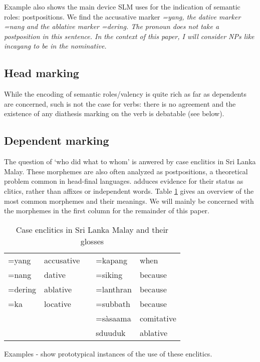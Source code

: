 \documentclass[a4paper,10pt]{article}
\begin{document}
Example  also shows the main device SLM uses for the indication of semantic roles: postpositions. We find the accusative marker \em =yang\em, the dative marker \em =nang \em and the ablative marker \em =dering\em. The pronoun  does not take a postposition in this sentence. In the context of this paper, I will consider NPs like \em incayang \em to be in the nominative.


\subsection{Head marking}
While the encoding of semantic roles/valency is quite rich as far as dependents are concerned, such is not the case for verbs: there is no agreement and the existence of any diathesis marking on the verb is debatable (see below).

\subsection{Dependent marking}\label{sec:dependentmarking}
The question of `who did what to whom'  is anwered by case enclitics in Sri Lanka Malay. These morphemes are also often analyzed as postpositions, a theoretical problem common in head-final languages. \citet{Nordhoff2009phd} adduces evidence for their status as clitics, rather than affixes or independent words. Table \ref{tab:enclitics} gives an overview of the most common morphemes and their meanings. We will mainly be concerned with the morphemes in the first column for the remainder of this paper.

\begin{table}
\centering
\begin{tabular}{ll|l|ll}
    =yang & accusative &&   =kapang  & when\\
    =nang & dative     &&   =siking  & because\\
    =dering & ablative &&   =lanthran& because\\
    =ka  & locative    &&   =subbath & because\\
	&              &&   =sàsaama & comitative\\
	&              &&   sduuduk & ablative\\
\end{tabular}
\caption{Case enclitics in Sri Lanka Malay and their glosses}
\label{tab:enclitics}
\end{table}

Examples  -  show prototypical instances of the use of these enclitics.
\end{document}
